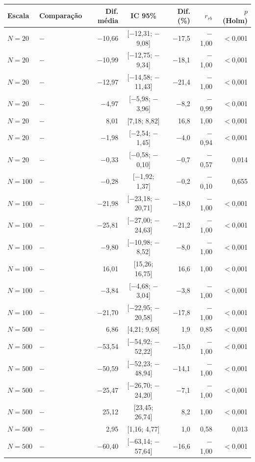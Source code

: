 \begin{tabular}{@{}llrcrrr@{}}
\toprule
Escala & Comparação & Dif. média & IC 95\% & Dif. (\%) & $r_{rb}$ & $p$ (Holm) \\
\midrule
$N=20$ & \polB{} $-$ \polA{} & $-$10,66 & [$-$12,31; $-$9,08] & $-$17,5 & $-$1,00 & $<$0,001 \\
$N=20$ & \polBOR{} $-$ \polA{} & $-$10,99 & [$-$12,75; $-$9,34] & $-$18,1 & $-$1,00 & $<$0,001 \\
$N=20$ & \polC{} $-$ \polA{} & $-$12,97 & [$-$14,58; $-$11,43] & $-$21,4 & $-$1,00 & $<$0,001 \\
$N=20$ & \polD{} $-$ \polA{} & $-$4,97 & [$-$5,98; $-$3,96] & $-$8,2 & $-$0,99 & $<$0,001 \\
$N=20$ & \polD{} $-$ \polC{} & 8,01 & [7,18; 8,82] & 16,8 & 1,00 & $<$0,001 \\
$N=20$ & \polC{} $-$ \polBOR{} & $-$1,98 & [$-$2,54; $-$1,45] & $-$4,0 & $-$0,94 & $<$0,001 \\
$N=20$ & \polBOR{} $-$ \polB{} & $-$0,33 & [$-$0,58; $-$0,10] & $-$0,7 & $-$0,57 & 0,014 \\
$N=100$ & \polB{} $-$ \polA{} & $-$0,28 & [$-$1,92; 1,37] & $-$0,2 & $-$0,10 & 0,655 \\
$N=100$ & \polBOR{} $-$ \polA{} & $-$21,98 & [$-$23,18; $-$20,71] & $-$18,0 & $-$1,00 & $<$0,001 \\
$N=100$ & \polC{} $-$ \polA{} & $-$25,81 & [$-$27,00; $-$24,63] & $-$21,2 & $-$1,00 & $<$0,001 \\
$N=100$ & \polD{} $-$ \polA{} & $-$9,80 & [$-$10,98; $-$8,52] & $-$8,0 & $-$1,00 & $<$0,001 \\
$N=100$ & \polD{} $-$ \polC{} & 16,01 & [15,26; 16,75] & 16,6 & 1,00 & $<$0,001 \\
$N=100$ & \polC{} $-$ \polBOR{} & $-$3,84 & [$-$4,68; $-$3,04] & $-$3,8 & $-$1,00 & $<$0,001 \\
$N=100$ & \polBOR{} $-$ \polB{} & $-$21,70 & [$-$22,95; $-$20,58] & $-$17,8 & $-$1,00 & $<$0,001 \\
$N=500$ & \polB{} $-$ \polA{} & 6,86 & [4,21; 9,68] & 1,9 & 0,85 & $<$0,001 \\
$N=500$ & \polBOR{} $-$ \polA{} & $-$53,54 & [$-$54,92; $-$52,22] & $-$15,0 & $-$1,00 & $<$0,001 \\
$N=500$ & \polC{} $-$ \polA{} & $-$50,59 & [$-$52,23; $-$48,94] & $-$14,1 & $-$1,00 & $<$0,001 \\
$N=500$ & \polD{} $-$ \polA{} & $-$25,47 & [$-$26,70; $-$24,20] & $-$7,1 & $-$1,00 & $<$0,001 \\
$N=500$ & \polD{} $-$ \polC{} & 25,12 & [23,45; 26,74] & 8,2 & 1,00 & $<$0,001 \\
$N=500$ & \polC{} $-$ \polBOR{} & 2,95 & [1,16; 4,77] & 1,0 & 0,58 & 0,013 \\
$N=500$ & \polBOR{} $-$ \polB{} & $-$60,40 & [$-$63,14; $-$57,64] & $-$16,6 & $-$1,00 & $<$0,001 \\
\bottomrule
\end{tabular}
